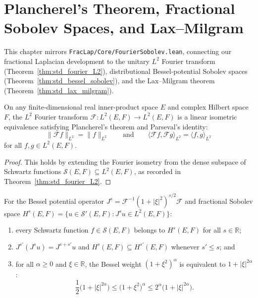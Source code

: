 \chapter{Plancherel's Theorem, Fractional Sobolev Spaces, and Lax--Milgram}

This chapter mirrors \texttt{FracLap/Core/FourierSobolev.lean}, connecting our fractional Laplacian development to the unitary $L^2$ Fourier transform (Theorem~\ref{thm:std_fourier_L2}), distributional Bessel-potential Sobolev spaces (Theorem~\ref{thm:std_bessel_sobolev}), and the Lax--Milgram theorem (Theorem~\ref{thm:std_lax_milgram}).

\begin{theorem}\label{thm:plancherel_and_parseval}
\leanok
On any finite-dimensional real inner-product space $E$ and complex Hilbert space $F$, the $L^2$ Fourier transform $\mathcal{F} : L^2(E, F) \to L^2(E, F)$ is a linear isometric equivalence satisfying Plancherel's theorem and Parseval's identity:
\[
  \lVert \mathcal{F} f \rVert_{L^2} = \lVert f \rVert_{L^2}
  \qquad \text{and} \qquad
  \langle \mathcal{F} f, \mathcal{F} g \rangle_{L^2} = \langle f, g \rangle_{L^2}
\]
for all $f, g \in L^2(E, F)$.
\end{theorem}

\begin{proof}
\leanok
This holds by extending the Fourier isometry from the dense subspace of Schwartz functions $\mathcal{S}(E, F) \subseteq L^2(E, F)$, as recorded in Theorem~\ref{thm:std_fourier_L2}.
\end{proof}

\begin{theorem}\label{thm:bessel_sobolev_properties}
\leanok
For the Bessel potential operator $J^s = \mathcal{F}^{-1} (1 + \lvert \xi \rvert^2)^{s/2} \mathcal{F}$ and fractional Sobolev space $H^s(E, F) = \{u \in \mathcal{S}'(E, F) : J^s u \in L^2(E, F)\}$:
\begin{enumerate}
  \item every Schwartz function $f \in \mathcal{S}(E, F)$ belongs to $H^s(E, F)$ for all $s \in \mathbb{R}$;
  \item $J^{s'} (J^s u) = J^{s + s'} u$ and $H^s(E, F) \subseteq H^{s'}(E, F)$ whenever $s' \le s$; and
  \item for all $\alpha \ge 0$ and $\xi \in \mathbb{R}$, the Bessel weight $(1 + \xi^2)^\alpha$ is equivalent to $1 + \lvert \xi \rvert^{2\alpha}$:
  \[
    \frac{1}{2}\bigl(1 + \lvert \xi \rvert^{2\alpha}\bigr) \le \bigl(1 + \xi^2\bigr)^\alpha \le 2^\alpha \bigl(1 + \lvert \xi \rvert^{2\alpha}\bigr).
  \]
\end{enumerate}
\end{theorem}

